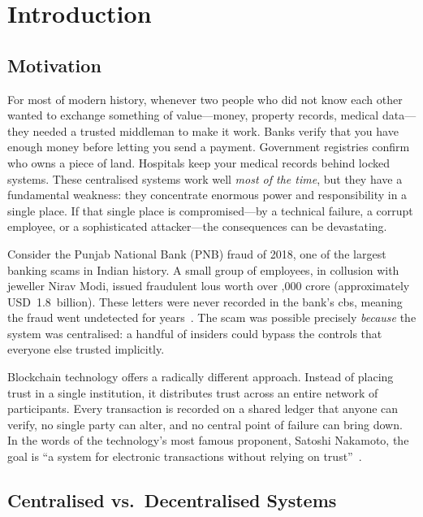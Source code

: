 \chapter{Introduction}
\label{ch:intro}

\section{Motivation}

For most of modern history, whenever two people who did not know each other wanted to exchange something of value---money, property records, medical data---they needed a trusted middleman to make it work. Banks verify that you have enough money before letting you send a payment. Government registries confirm who owns a piece of land. Hospitals keep your medical records behind locked systems.  These centralised systems work well \emph{most of the time}, but they have a fundamental weakness: they concentrate enormous power and responsibility in a single place. If that single place is compromised---by a technical failure, a corrupt employee, or a sophisticated attacker---the consequences can be devastating.

Consider the Punjab National Bank (PNB) fraud of 2018, one of the largest banking scams in Indian history. A small group of employees, in collusion with jeweller Nirav Modi, issued fraudulent \glspl{lou} worth over ,000 crore (approximately USD~1.8~billion). These letters were never recorded in the bank's \gls{cbs}, meaning the fraud went undetected for years~\cite{web:apptunix}. The scam was possible precisely \emph{because} the system was centralised: a handful of insiders could bypass the controls that everyone else trusted implicitly.

Blockchain technology offers a radically different approach. Instead of placing trust in a single institution, it distributes trust across an entire network of participants. Every transaction is recorded on a shared ledger that anyone can verify, no single party can alter, and no central point of failure can bring down. In the words of the technology's most famous proponent, Satoshi Nakamoto, the goal is ``a system for electronic transactions without relying on trust''~\cite{nakamoto2008bitcoin}.

\section{Centralised vs.\ Decentralised Systems}
\label{sec:cent-decent}


